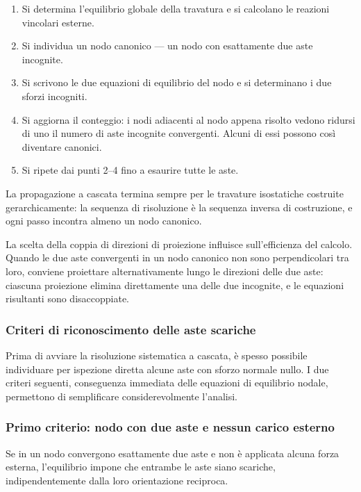 \begin{enumerate}[noitemsep]
	\item Si determina l'equilibrio globale della
	travatura e si calcolano le reazioni vincolari
	esterne.
	\item Si individua un nodo canonico --- un nodo
	con esattamente due aste incognite.
	\item Si scrivono le due equazioni di equilibrio
	del nodo e si determinano i due sforzi
	incogniti.
	\item Si aggiorna il conteggio: i nodi adiacenti
	al nodo appena risolto vedono ridursi di uno
	il numero di aste incognite convergenti.
	Alcuni di essi possono così diventare
	canonici.
	\item Si ripete dai punti 2--4 fino a esaurire
	tutte le aste.
\end{enumerate}

La propagazione a cascata termina sempre per le
travature isostatiche costruite gerarchicamente:
la sequenza di risoluzione è la sequenza inversa
di costruzione, e ogni passo incontra almeno un
nodo canonico.

\begin{oss}
	La scelta della coppia di direzioni di proiezione
	influisce sull'efficienza del calcolo. Quando le
	due aste convergenti in un nodo canonico non sono
	perpendicolari tra loro, conviene proiettare
	alternativamente lungo le direzioni delle due aste:
	ciascuna proiezione elimina direttamente una delle
	due incognite, e le equazioni risultanti sono
	disaccoppiate.
\end{oss}


\subsubsection{Criteri di riconoscimento delle aste scariche}

Prima di avviare la risoluzione sistematica a cascata,
è spesso possibile individuare per ispezione diretta
alcune aste con sforzo normale nullo. I due criteri
seguenti, conseguenza immediata delle equazioni di
equilibrio nodale, permettono di semplificare
considerevolmente l'analisi.

\subsubsection{Primo criterio: nodo con due aste e nessun	carico esterno}
Se in un nodo convergono esattamente due aste e
non è applicata alcuna forza esterna, l'equilibrio
impone che entrambe le aste siano scariche,
indipendentemente dalla loro orientazione reciproca.



